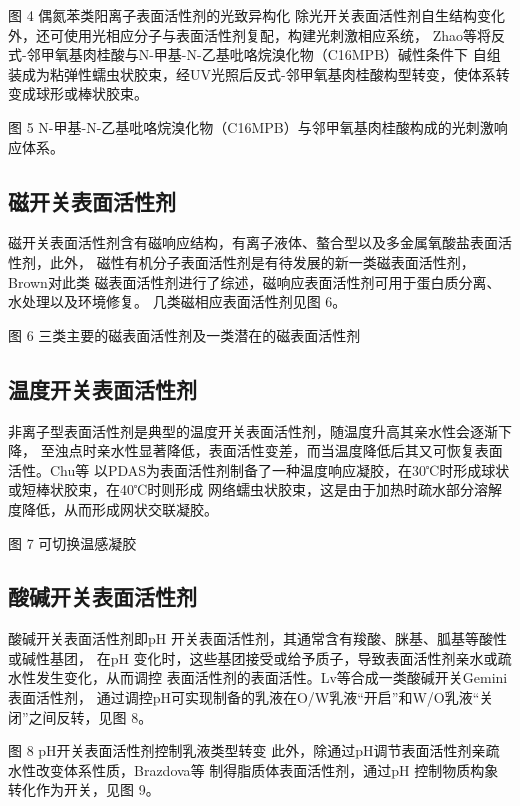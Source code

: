 \documentclass[bachelor,winfonts]{jnuthesis} %
\begin{document}
    图 4 偶氮苯类阳离子表面活性剂的光致异构化\cite{chen2016}
    除光开关表面活性剂自生结构变化外，还可使用光相应分子与表面活性剂复配，构建光刺激相应系统，
    Zhao等\cite{zhao2016}将反式-邻甲氧基肉桂酸与N-甲基-N-乙基吡咯烷溴化物（C16MPB）碱性条件下
    自组装成为粘弹性蠕虫状胶束，经UV光照后反式-邻甲氧基肉桂酸构型转变，使体系转变成球形或棒状胶束。
    
    图 5 N-甲基-N-乙基吡咯烷溴化物（C16MPB）与邻甲氧基肉桂酸构成的光刺激响应体系\cite{zhao2016}。
    
    \subsection{磁开关表面活性剂}
    磁开关表面活性剂含有磁响应结构，有离子液体、螯合型以及多金属氧酸盐表面活性剂，此外，
    磁性有机分子表面活性剂是有待发展的新一类磁表面活性剂\cite{brown2015}，Brown\cite{brown2015}对此类
    磁表面活性剂进行了综述，磁响应表面活性剂可用于蛋白质分离、水处理以及环境修复\cite{brown2015}。
    几类磁相应表面活性剂见图 6。
    
    图 6 三类主要的磁表面活性剂及一类潜在的磁表面活性剂\cite{brown2015,brown2012}
    
    \subsection{温度开关表面活性剂}
    非离子型表面活性剂是典型的温度开关表面活性剂，随温度升高其亲水性会逐渐下降，
    至浊点时亲水性显著降低，表面活性变差，而当温度降低后其又可恢复表面活性。Chu\cite{chu2011}等
    以PDAS为表面活性剂制备了一种温度响应凝胶，在30℃时形成球状或短棒状胶束，在40℃时则形成
    网络蠕虫状胶束，这是由于加热时疏水部分溶解度降低，从而形成网状交联凝胶。
    
    图 7 可切换温感凝胶
    \subsection{酸碱开关表面活性剂}
    酸碱开关表面活性剂即pH 开关表面活性剂，其通常含有羧酸、脒基、胍基等酸性或碱性基团，
    在pH 变化时，这些基团接受或给予质子，导致表面活性剂亲水或疏水性发生变化，从而调控
    表面活性剂的表面活性\cite{吕湘亮2018}。Lv\cite{lv2014}等合成一类酸碱开关Gemini表面活性剂，
    通过调控pH可实现制备的乳液在O/W乳液“开启”和W/O乳液“关闭”之间反转，见图 8。
    
    图 8 pH开关表面活性剂控制乳液类型转变
    此外，除通过pH调节表面活性剂亲疏水性改变体系性质，Brazdova\cite{李云霞2011,brazdova2008}等
    制得脂质体表面活性剂，通过pH 控制物质构象转化作为开关，见图 9。
    
\end{document}
